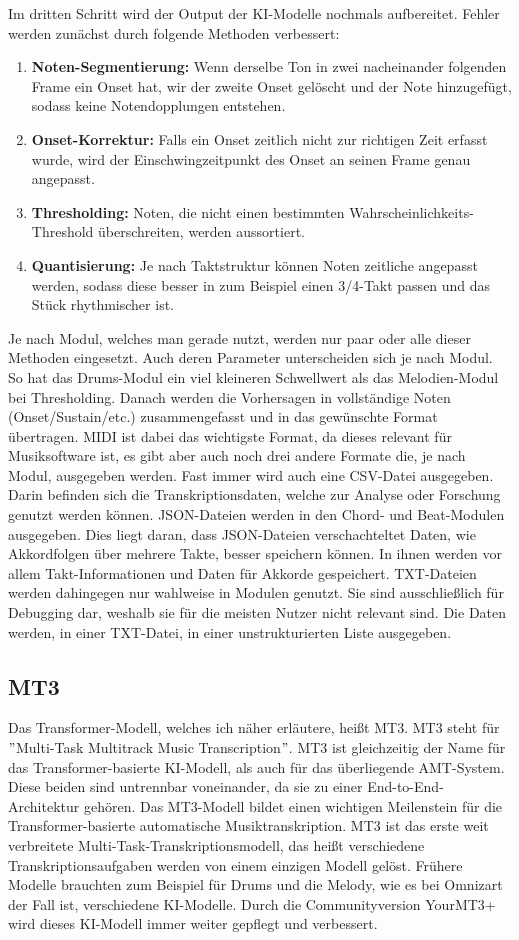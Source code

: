 Im dritten Schritt wird der Output der KI-Modelle nochmals aufbereitet.
Fehler werden zunächst durch folgende Methoden verbessert:
\begin{enumerate}
    \item \textbf{Noten-Segmentierung:} Wenn derselbe Ton in zwei nacheinander folgenden Frame ein Onset hat, wir der zweite Onset gelöscht und der Note hinzugefügt, sodass keine Notendopplungen entstehen.
    \item \textbf{Onset-Korrektur:} Falls ein Onset zeitlich nicht zur richtigen Zeit erfasst wurde, wird der Einschwingzeitpunkt des Onset an seinen Frame genau angepasst.
    \item \textbf{Thresholding:} Noten, die nicht einen bestimmten Wahrscheinlichkeits-Threshold überschreiten, werden aussortiert.
    \item \textbf{Quantisierung:} Je nach Taktstruktur können Noten zeitliche angepasst werden, sodass diese besser in zum Beispiel einen 3/4-Takt passen und das Stück rhythmischer ist.
\end{enumerate}
Je nach Modul, welches man gerade nutzt, werden nur paar oder alle dieser Methoden eingesetzt.
Auch deren Parameter unterscheiden sich je nach Modul.
So hat das Drums-Modul ein viel kleineren Schwellwert als das Melodien-Modul bei Thresholding.
Danach werden die Vorhersagen in vollständige Noten (Onset/Sustain/etc.)
zusammengefasst und in das gewünschte Format übertragen.
MIDI ist dabei das wichtigste Format, da dieses relevant für Musiksoftware ist,
es gibt aber auch noch drei andere Formate die, je nach Modul, ausgegeben werden.
Fast immer wird auch eine CSV-Datei ausgegeben.
Darin befinden sich die Transkriptionsdaten, welche zur Analyse oder Forschung genutzt werden können.
JSON-Dateien werden in den Chord- und Beat-Modulen ausgegeben.
Dies liegt daran, dass JSON-Dateien verschachteltet Daten, wie Akkordfolgen über mehrere Takte, besser speichern können.
In ihnen werden vor allem Takt-Informationen und Daten für Akkorde gespeichert.
TXT-Dateien werden dahingegen nur wahlweise in Modulen genutzt.
Sie sind ausschließlich für Debugging dar, weshalb sie für die meisten Nutzer nicht relevant sind.
Die Daten werden, in einer TXT-Datei, in einer unstrukturierten Liste ausgegeben.

\subsection{MT3}
Das Transformer-Modell, welches ich näher erläutere, heißt MT3.
MT3 steht für \("\)Multi-Task Multitrack Music Transcription\("\).
MT3 ist gleichzeitig der Name für das Transformer-basierte KI-Modell, als auch für das überliegende AMT-System.
Diese beiden sind untrennbar voneinander, da sie zu einer End-to-End-Architektur gehören.
Das MT3-Modell bildet einen wichtigen Meilenstein für die Transformer-basierte automatische Musiktranskription.
MT3 ist das erste weit verbreitete Multi-Task-Transkriptionsmodell,
das heißt verschiedene Transkriptionsaufgaben werden von einem einzigen Modell gelöst.
Frühere Modelle brauchten zum Beispiel für Drums und die Melody,
wie es bei Omnizart der Fall ist, verschiedene KI-Modelle.
Durch die Communityversion YourMT3+ wird dieses KI-Modell immer weiter gepflegt und verbessert.

